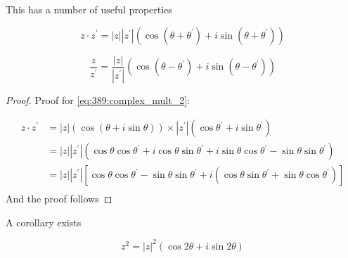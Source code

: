 \documentclass[10pt]{article}
\begin{document}
This has a number of useful properties


\begin{equation}
	z \cdot  z^\prime = |z| |z^\prime| (\cos(\theta + \theta^\prime) + i \sin(\theta + \theta^\prime))
	\label{eq:389:complex_mult_2}
\end{equation}

\begin{equation}
	\frac{z}{z^\prime} = \frac{|z|}{|z^\prime|} (\cos(\theta - \theta^\prime) + i \sin(\theta - \theta^\prime))
	\label{eq:389:complex_div_2}
\end{equation}


\begin{proof}
	Proof for \eqref{eq:389:complex_mult_2}:

	\begin{equation}
		\begin{split}
			z \cdot  z^\prime &= |z|(\cos(\theta + i \sin \theta)) \times |z^\prime| (\cos \theta^\prime + i \sin \theta ^\prime) \\
			 &= |z| |z^\prime| (\cos\theta \cos\theta^\prime + i \cos\theta \sin\theta^\prime + i \sin \theta \cos \theta^\prime - \sin\theta \sin\theta^\prime ) \\ 
			 &= |z| |z^\prime| \left[ \cos\theta \cos \theta^\prime - \sin \theta \sin \theta^\prime   + i (\cos\theta \sin\theta^\prime + \sin\theta \cos\theta^\prime)\right]  \\
		\end{split}
	\end{equation}
	And the proof follows
\end{proof}


\begin{lemma}
	A corollary exists

	\begin{equation}
		z^2 = |z|^2 (\cos2\theta + i \sin 2 \theta)
	\end{equation}
	
\end{lemma}
\end{document}
